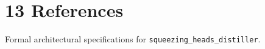 \section{13 References}

Formal architectural specifications for \texttt{squeezing_heads_distiller}.
